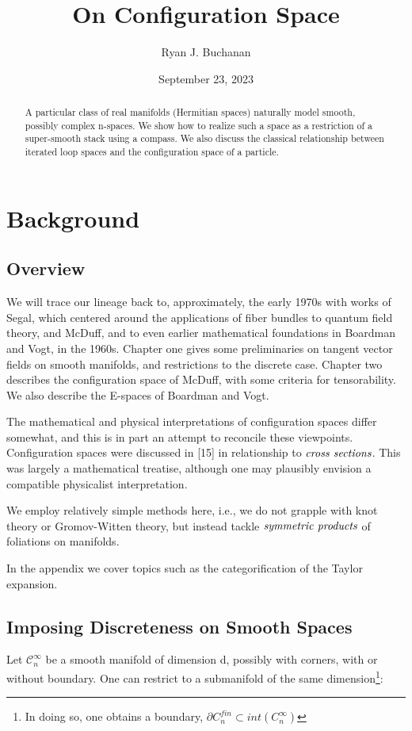 \documentclass{article}
\title{On Configuration Space}
\author{Ryan J. Buchanan}
\date{September 23, 2023}
\begin{document}
	\maketitle
	
	\tableofcontents
	
	\begin{abstract}
		A particular class of real manifolds (Hermitian spaces) naturally model smooth, possibly complex n-spaces. We show how to realize such a space as a restriction of a super-smooth stack using a compass. We also discuss the classical relationship between iterated loop spaces and the configuration space of a particle.
	\end{abstract}
	
	\section{Background}
	\subsection{Overview}
	We will trace our lineage back to, approximately, the early 1970s with works of Segal, which centered around the applications of fiber bundles to quantum field theory, and McDuff, and to even earlier mathematical foundations in Boardman and Vogt, in the 1960s. Chapter one gives some preliminaries on tangent vector fields on smooth manifolds, and restrictions to the discrete case. Chapter two describes the configuration space of McDuff, with some criteria for tensorability. We also describe the E-spaces of Boardman and Vogt.
	
	The mathematical and physical interpretations of configuration spaces differ somewhat, and this is in part an attempt to reconcile these viewpoints. Configuration spaces were discussed in [15] in relationship to $\emph{cross sections}$. This was largely a mathematical treatise, although one may plausibly envision a compatible physicalist interpretation. 
	
	We employ relatively simple methods here, i.e., we do not grapple with knot theory or Gromov-Witten theory, but instead tackle $\emph{symmetric products}$ of foliations on manifolds.
	
	In the appendix we cover topics such as the categorification of the Taylor expansion.
	
	
	\subsection{Imposing Discreteness on Smooth Spaces}
	Let $\mathcal{C}_n^\infty$ be a smooth manifold of dimension d, possibly with corners, with or without boundary. One can restrict to a submanifold of the same dimension\footnote{In doing so, one obtains a boundary, $\partial C_n^{fin} \subset int(C_n^\infty)$}:
	
\end{document}
